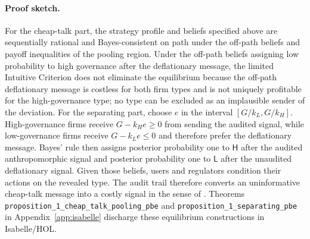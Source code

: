 \paragraph{Proof sketch.}
For the cheap-talk part, the strategy profile and beliefs specified above are
sequentially rational and Bayes-consistent on path under the off-path beliefs and payoff inequalities of the pooling region. Under the off-path beliefs
assigning low probability to high governance after the deflationary message, the
limited Intuitive Criterion does not eliminate the equilibrium because the off-path
deflationary message is costless for both firm types and is not uniquely
profitable for the high-governance type; no type can be excluded as an
implausible sender of the
deviation. For the separating part, choose $e$ in the interval
$[G/k_L,G/k_H]$. High-governance firms receive $G-k_He\geq 0$ from sending the
audited signal, while low-governance firms receive $G-k_Le\leq 0$ and therefore
prefer the deflationary message. Bayes' rule then assigns posterior probability
one to $\mathsf{H}$ after the audited anthropomorphic signal and posterior
probability one to $\mathsf{L}$ after the unaudited deflationary signal. Given
those beliefs, users and regulators condition their actions on the revealed type.
The audit trail therefore converts an uninformative cheap-talk message into a
costly signal in the sense of \citet{spence1973}. Theorems \texttt{proposition\_\allowbreak{}1\_\allowbreak{}cheap\_\allowbreak{}talk\_\allowbreak{}pooling\_\allowbreak{}pbe} and \texttt{proposition\_\allowbreak{}1\_\allowbreak{}separating\_\allowbreak{}pbe} in Appendix~\ref{app:isabelle} discharge these equilibrium constructions in Isabelle/HOL.
